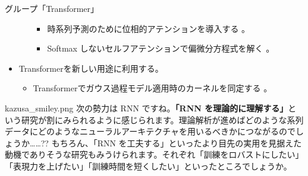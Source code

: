 \documentclass[b5paper,xelatex,ja=standard,10pt]{bxjsarticle}
\begin{document}
\begin{PROP}[left=0pt]{グループ「Transformer」}
\begin{itemize}
\begin{itemize}
\begin{itemize}
      \item 時系列予測のために位相的アテンションを導入する \cite{SebastianZeng2021}。
      \item Softmax しないセルフアテンションで偏微分方程式を解く \cite{ShuhaoCao2021}。
    \end{itemize}
  \end{itemize}
  \vspace{6pt}
  \item Transformerを新しい用途に利用する。
  \begin{itemize}
    \item Transformerでガウス過程モデル適用時のカーネルを同定する \cite{FergusSimpson2021}。
  \end{itemize}
\end{itemize}
\end{PROP}
\vspace{1pt}

\begin{SERIFU}[colback=PaleIris, colbacktitle=PaleIris2]{kazusa_smiley.png}
次の勢力は RNN ですね。\textbf{「RNN を理論的に理解する」}という研究が割にみられるように感じられます。理論解析が進めばどのような系列データにどのようなニューラルアーキテクチャを用いるべきかにつながるのでしょうか……?? もちろん、「RNN を工夫する」といったより目先の実用を見据えた動機でありそうな研究もみうけられます。それぞれ「訓練をロバストにしたい」「表現力を上げたい」「訓練時間を短くしたい」といったところでしょうか。
\end{SERIFU}
\end{document}
